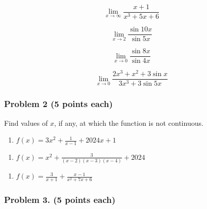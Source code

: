 \documentclass[
  letterpaper,
  DIV=11,
  numbers=noendperiod]{scrartcl}
\providecommand{\tightlist}{%
  \setlength{\itemsep}{0pt}\setlength{\parskip}{0pt}}\usepackage{longtable,booktabs,array}
\begin{document}
\[\lim_{x \to \infty} \frac{x+1}{x^3 +5x + 6}\]

\hfill\break
\hfill\break
\hfill\break
\hfill\break
\hfill\break
\thispagestyle{empty}

\[\lim_{x \to 2} \frac{\sin 10x }{\sin 5x}\]

\hfill\break
\hfill\break
\hfill\break
\hfill\break
\hfill\break

\[\lim_{x \to 0} \frac{\sin 8x }{\sin 4x}\]

\hfill\break
\hfill\break
\hfill\break
\hfill\break
\hfill\break

\[\lim_{x \to 0} \frac{2x^3 + x ^2+ 3\sin x }{3x^3 + 3\sin 5x}\]

\hfill\break
\hfill\break
\hfill\break
\hfill\break
\hfill\break

\subsubsection{Problem 2 (5 points each)}\label{problem-2-5-points-each}

Find values of \(x\), if any, at which the function is not continuous.

\begin{enumerate}
\def\labelenumi{\alph{enumi}.}
\tightlist
\item
  \(f(x) = 3x^2 + \frac{1}{x-1} + 2024x +1\)
\end{enumerate}

\hfill\break
\hfill\break
\hfill\break
\hfill\break
\hfill\break

\thispagestyle{empty}

\begin{enumerate}
\def\labelenumi{\alph{enumi}.}
\setcounter{enumi}{1}
\tightlist
\item
  \(f(x) = x^2 + \frac{3}{(x - 2)(x-3)(x-4)} + 2024\)
\end{enumerate}

\hfill\break
\hfill\break
\hfill\break
\hfill\break
\hfill\break

\begin{enumerate}
\def\labelenumi{\alph{enumi}.}
\setcounter{enumi}{2}
\tightlist
\item
  \(f(x) = \frac{3}{x + 1} + \frac{x-1}{x^2 + 7x + 6}\)
\end{enumerate}

\hfill\break
\hfill\break
\hfill\break
\hfill\break
\hfill\break

\subsubsection{Problem 3. (5 points
each)}\label{problem-3.-5-points-each}
\end{document}
